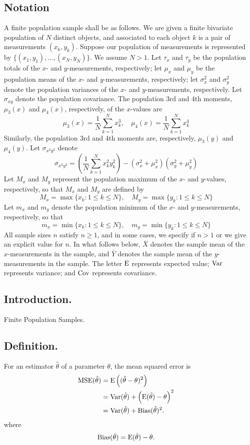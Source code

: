 \documentclass[titlepage]{article}
\begin{document}
\subsection{Notation} A finite population sample shall be as follows. We are given a finite bivariate population of $N$ distinct objects, and associated to each object $k$ is a pair of measurements $(x_k, y_k)$. Suppose our population of measurements is represented by $\{(x_1, y_1), \ldots, (x_N, y_N)\}$. We assume $N > 1$. Let $\tau_x$ and $\tau_y$ be the population totals of the $x$- and $y$-measurements, respectively; let $\mu_x$ and $\mu_y$ be the population means of the $x$- and $y$-measurements, respectively; let $\sigma_x^2$ and $\sigma_y^2$ denote the population variances of the $x$- and $y$-measurements, respectively. Let $\sigma_{xy}$ denote the population covariance.
The population 3rd and 4th moments, $\mu_3(x)$ and $\mu_4(x)$, respectively, of the $x$-values are
$$\mu_3(x) = \frac{1}{N} \sum_{k=1}^{N} x_k^3, \quad \mu_4(x) = \frac{1}{N} \sum_{k=1}^{N} x_k^4$$
Similarly, the population 3rd and 4th moments are, respectively, $\mu_3(y)$ and $\mu_4(y)$.
Let $\sigma_{x^2y^2}$ denote
$$\sigma_{x^2y^2} = \left( \frac{1}{N} \sum_{k=1}^{N} x_k^2 y_k^2 \right) - (\sigma_x^2 + \mu_x^2)(\sigma_y^2 + \mu_y^2)$$
Let $M_x$ and $M_y$ represent the population maximum of the $x$- and $y$-values, respectively, so that $M_x$ and $M_y$ are defined by
$$M_x = \max\{x_k : 1 \leq k \leq N\}, \quad M_y = \max\{y_k : 1 \leq k \leq N\}$$
Let $m_x$ and $m_y$ denote the population minimum of the $x$- and $y$-measurements, respectively, so that
$$m_x = \min\{x_k : 1 \leq k \leq N\}, \quad m_y = \min\{y_k : 1 \leq k \leq N\}$$
All sample sizes $n$ satisfy $n \geq 1$, and in some cases, we specify if $n > 1$ or we give an explicit value for $n$. In what follows below, $\bar{X}$ denotes the sample mean of the $x$-measurements in the sample, and $\bar{Y}$ denotes the sample mean of the $y$-measurements in the sample. The letter $\text{E}$ represents expected value; $\text{Var}$ represents variance; and $\text{Cov}$ represents covariance.

\newpage {}

\subsection{Introduction.} Finite Population Samples.

\subsection{Definition.} For an estimator $\hat{\theta}$ of a parameter $\theta$, the mean squared error is 
\begin{align*}
    \text{MSE}(\hat{\theta}) &= \text{E}\left((\hat{\theta} - \theta)^{2}\right) \\
                       &= \text{Var}(\hat{\theta}) + \left(\text{E}(\hat{\theta}) - \theta\right)^{2} \\
                       &= \text{Var}(\hat{\theta}) + \text{Bias}(\hat{\theta})^{2}.
\end{align*}
where 
$$\text{Bias}(\hat{\theta}) = \text{E}(\hat{\theta}) - \theta.$$
\end{document}
